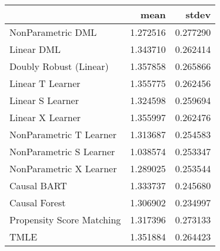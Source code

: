 \begin{tabular}{lrr}
\toprule
{} &      mean &     stdev \\
\midrule
NonParametric DML         &  1.272516 &  0.277290 \\
Linear DML                &  1.343710 &  0.262414 \\
Doubly Robust (Linear)    &  1.357858 &  0.265866 \\
Linear T Learner          &  1.355775 &  0.262456 \\
Linear S Learner          &  1.324598 &  0.259694 \\
Linear X Learner          &  1.355997 &  0.262476 \\
NonParametric T Learner   &  1.313687 &  0.254583 \\
NonParametric S Learner   &  1.038574 &  0.253347 \\
NonParametric X Learner   &  1.289025 &  0.253544 \\
Causal BART               &  1.333737 &  0.245680 \\
Causal Forest             &  1.306902 &  0.234997 \\
Propensity Score Matching &  1.317396 &  0.273133 \\
TMLE                      &  1.351884 &  0.264423 \\
\bottomrule
\end{tabular}
